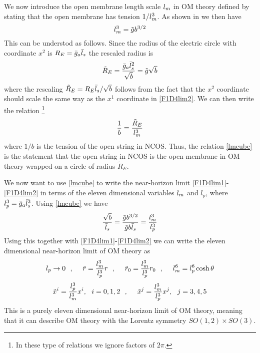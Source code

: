 \documentclass[a4paper,twoside,titlepage,12pt]{article}
\begin{document}
We now introduce the open membrane length scale \( l_m \) in OM theory
defined by stating that the open membrane has tension \( 1 / l_m^3 \).
As shown in \cite{Gopakumar:2000ep,Bergshoeff:2000ai} we then have
%
\begin{equation}
\label{lmcube}
l_m^3 = \tilde{g} b^{3/2}
\end{equation}
%
This can be understod as follows.
Since the radius of the electric circle with coordinate \( x^2 \)
is \( R_E = \bar{g}_a \bar{l}_s \) the rescaled radius is 
%
\begin{equation}
\tilde{R}_E = \frac{\bar{g}_a \bar{l}_s^2}{\sqrt{b}} = \tilde{g} \sqrt{b}
\end{equation}
%
where the rescaling \( \tilde{R}_E = R_E \bar{l}_s / \sqrt{b} \) follows
from the fact that the \( x^2 \) coordinate should scale the same
way as the \( x^1 \) coordinate in \eqref{F1D4lim2}.
We can then write the relation%
\footnote{In these type of relations we ignore factors of $2\pi$.}
%
\begin{equation}
\frac{1}{b} = \frac{\tilde{R}_E}{l_m^3}
\end{equation}
%
where \( 1/b \) is the tension of the open string in NCOS.
Thus, the relation \eqref{lmcube} is the statement 
that the open string in NCOS is the open membrane in OM theory
wrapped on a circle of radius \( \tilde{R}_E \).

We now want to use \eqref{lmcube} to write the near-horizon limit 
\eqref{F1D4lim1}-\eqref{F1D4lim2} in terms of the eleven dimensional
variables \( l_m \) and \( l_p \), where \( l_p^3 = \bar{g}_a \bar{l}_s^3 \).
Using \eqref{lmcube} we have 
%
\begin{equation}
\frac{\sqrt{b}}{\bar{l}_s} = \frac{\tilde{g} b^{3/2}}{\tilde{g} b \bar{l}_s}
= \frac{l_m^3}{l_p^3}
\end{equation}
%
Using this together with \eqref{F1D4lim1}-\eqref{F1D4lim2} 
we can write the eleven dimensional near-horizon limit of
OM theory as
%
\begin{equation}
\label{M2M5lim1}
l_p \rightarrow 0 \ \ ,\ \ \ \ 
\tilde{r} = \frac{l_m^3}{l_p^3} r \ \ ,\ \ \ \ 
\tilde{r}_0 = \frac{l_m^3}{l_p^3 } r_0 \ \ ,\ \ \ \ 
l_m^6 = l_p^6 \cosh \theta
\end{equation}
%
\begin{equation}
\label{M2M5lim2}
\tilde{x}^i = \frac{l_p^3}{l_m^3} x^i, \ \ i=0,1,2 \ \ ,\ \ \ \ 
\tilde{x}^j = \frac{l_m^3}{l_p^3} x^j,\ \ j=3,4,5 
\end{equation}
%
This is a purely eleven dimensional near-horizon limit of
OM theory, meaning that it can describe OM theory
with the Lorentz symmetry \( SO(1,2) \times SO(3) \).
\end{document}
